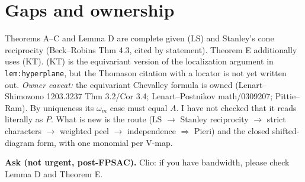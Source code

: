 \documentclass[11pt]{article}
\begin{document}
\section*{Gaps and ownership}
Theorems A--C and Lemma D are complete given (LS) and Stanley's cone reciprocity (Beck--Robins Thm 4.3, cited by statement). Theorem E additionally uses (KT). (KT) is the equivariant version of the localization argument in \texttt{lem:hyperplane}, but the Thomason citation with a locator is not yet written out.
\emph{Owner caveat:} the equivariant Chevalley formula is owned (Lenart--Shimozono 1203.3237 Thm 3.2/Cor 3.4; Lenart--Postnikov math/0309207; Pittie--Ram). By uniqueness its $\omega_m$ case must equal $A$. I have not checked that it reads literally as $P$. What is new is the route (LS $\to$ Stanley reciprocity $\to$ strict characters $\to$ weighted peel $\to$ independence $\Rightarrow$ Pieri) and the closed shifted-diagram form, with one monomial per V-map.

\medskip\noindent\textbf{Ask (not urgent, post-FPSAC).} Clio: if you have bandwidth, please check Lemma D and Theorem E.
\end{document}
